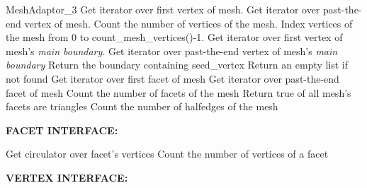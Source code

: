 \begin{ccRefConcept}{MeshAdaptor_3}
	{Get iterator over first vertex of mesh.}
\ccGlue
{}
	{Get iterator over past-the-end vertex of mesh.}
\ccGlue
{}
	{Count the number of vertices of the mesh.}
\ccGlue
{}
	{Index vertices of the mesh from 0 to count\_mesh\_vertices()-1.}
\ccGlue
{}
	{Get iterator over first vertex of mesh's \emph{main boundary}.}
\ccGlue
{}
	{Get iterator over past-the-end vertex of mesh's \emph{main boundary}}
\ccGlue
{}
	{Return the boundary containing seed\_vertex
	 Return an empty list if not found}
\ccGlue
{}
	{Get iterator over first facet of mesh}
\ccGlue
{}
	{Get iterator over past-the-end facet of mesh}
\ccGlue
{}
	{Count the number of facets of the mesh}
\ccGlue
{}
	{Return true of all mesh's facets are triangles}
\ccGlue
{}
	{Count the number of halfedges of the mesh}

\textbf{FACET INTERFACE:}

	{Get circulator over facet's vertices}
\ccGlue
{}
	{Count the number of vertices of a facet}

\textbf{VERTEX INTERFACE:}


\end{ccRefConcept}
